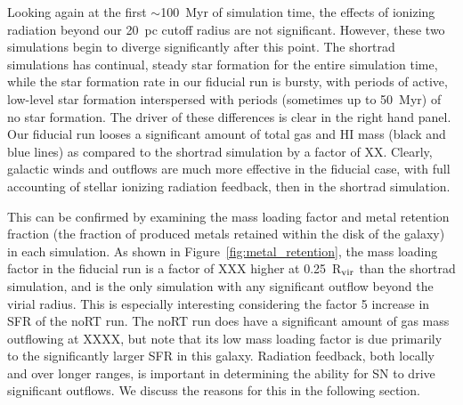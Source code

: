 \documentclass[twocolumn]{aastex62}
\begin{document}
Looking again at the first $\sim$100~Myr of simulation time, the effects of ionizing radiation beyond our 20~pc cutoff radius are not significant. However, these two simulations begin to diverge significantly after this point. The shortrad simulations has continual, steady star formation for the entire simulation time, while the star formation rate in our fiducial run is bursty, with periods of active, low-level star formation interspersed with periods (sometimes up to 50~Myr) of no star formation. The driver of these differences is clear in the right hand panel. Our fiducial run looses a significant amount of total gas and HI mass (black and blue lines) as compared to the shortrad simulation by a factor of XX. Clearly, galactic winds and outflows are much more effective in the fiducial case, with full accounting of stellar ionizing radiation feedback, then in the shortrad simulation.

This can be confirmed by examining the mass loading factor and metal retention fraction (the fraction of produced metals retained within the disk of the galaxy) in each simulation. As shown in Figure~\ref{fig:metal_retention}, the mass loading factor in the fiducial run is a factor of XXX higher at 0.25~R$_{\rm vir}$ than the shortrad simulation, and is the only simulation with any significant outflow beyond the virial radius. This is especially interesting considering the factor 5 increase in SFR of the noRT run. The noRT run does have a significant amount of gas mass outflowing at XXXX, but note that its low mass loading factor is due primarily to the significantly larger SFR in this galaxy. Radiation feedback, both locally and over longer ranges, is important in determining the ability for SN to drive significant outflows. We discuss the reasons for this in the following section.
\end{document}
